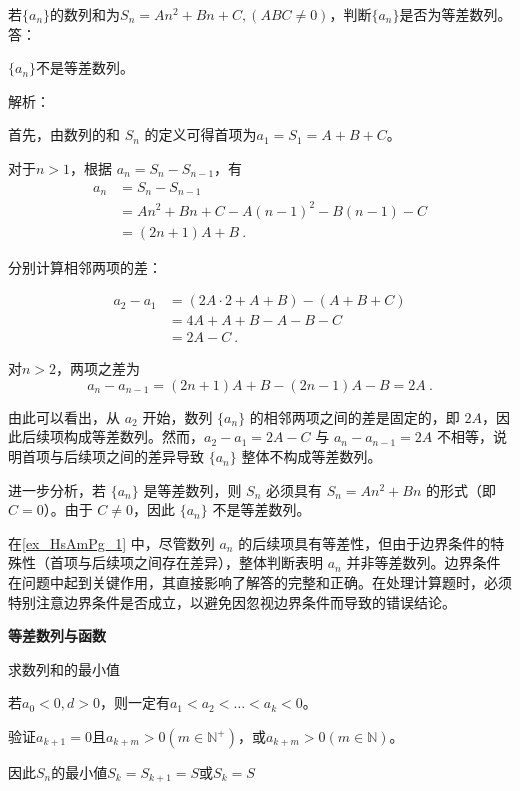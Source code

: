 \begin{example}{若$\{a_n\}$的数列和为$S_n=An^2+Bn+C,(ABC\neq0)$，判断$\{a_n\}$是否为等差数列。}\label{ex_HsAmPg_1}
答：

$\{a_n\}$不是等差数列。

解析：

首先，由数列的和 $S_n$ 的定义可得首项为$a_1=S_1=A+B+C$。

对于$n>1$，根据 $a_n = S_n - S_{n-1}$，有
\begin{equation}
\begin{split}
a_n &= S_n-S_{n-1}\\
&=An^2+Bn+C-A(n-1)^2-B(n-1)-C\\
&=(2n+1)A+B~.
\end{split}
\end{equation}

分别计算相邻两项的差：

\begin{equation}
\begin{split}
a_2 - a_1 &= (2A \cdot 2 + A + B) - (A + B + C) \\
&= 4A + A + B - A - B - C \\
&= 2A - C~.
\end{split}
\end{equation}

对$n>2$，两项之差为
\begin{equation}
a_n-a_{n-1} = (2n+1)A+B-(2n-1)A-B=2A~.
\end{equation}

由此可以看出，从 $a_2$ 开始，数列 $\{a_n\}$ 的相邻两项之间的差是固定的，即 $2A$，因此后续项构成等差数列。然而，$a_2 - a_1 = 2A - C$ 与 $a_n - a_{n-1} = 2A$ 不相等，说明首项与后续项之间的差异导致 $\{a_n\}$ 整体不构成等差数列。

进一步分析，若 $\{a_n\}$ 是等差数列，则 $S_n$ 必须具有 $S_n = An^2 + Bn$ 的形式（即 $C = 0$）。由于 $C \neq 0$，因此 $\{a_n\}$ 不是等差数列。
\end{example}

在\autoref{ex_HsAmPg_1} 中，尽管数列 ${a_n}$ 的后续项具有等差性，但由于边界条件的特殊性（首项与后续项之间存在差异），整体判断表明 ${a_n}$ 并非等差数列。边界条件在问题中起到关键作用，其直接影响了解答的完整和正确。在处理计算题时，必须特别注意边界条件是否成立，以避免因忽视边界条件而导致的错误结论。

\textbf{等差数列与函数}

求数列和的最小值

若$a_0<0,d>0$，则一定有$a_1<a_2<\dots<a_{k}<0$。

验证$a_{k+1} =0$且$a_{k+m}>0(m\in\mathbb{N}^+)$，或$a_{k+m}>0(m\in\mathbb{N})$。

因此$S_n$的最小値$S_k=S_{k+1}=S$或$S_k=S$
